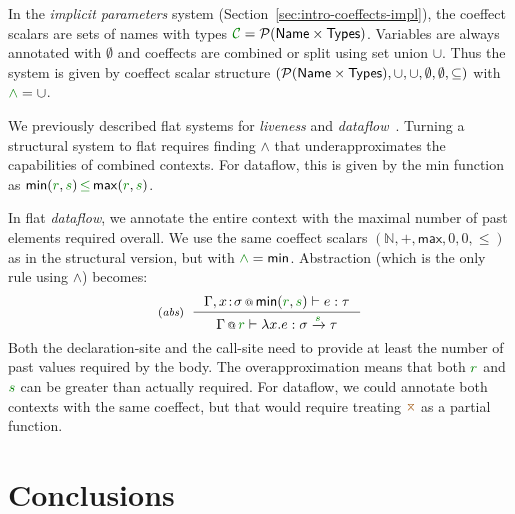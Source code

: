 In the \emph{implicit parameters} system (Section~\ref{sec:intro-coeffects-impl}), 
the co\-effect scalars are sets of names with types 
$\C = \mathcal{P}(\ident{Name} \times \ident{Types}) $. Variables
are always annotated with $\emptyset$ and coeffects are combined or split using set union $\cup$. Thus
the system is given by coeffect scalar structure $(\mathcal{P}(\textnormal{\sffamily Name} \times \textnormal{\sffamily Types}), \cup, \cup, \emptyset, \emptyset, \subseteq)$
with $\cclrd{\wedge} = \cup$.

\begin{remark}
We previously described flat systems for \emph{liveness} and \emph{dataflow}~\cite{petricek2013coeffects}.
Turning a structural system to flat requires finding $\wedge$ that 
underapproximates the capabilities of combined contexts. For dataflow, this is given by the \textsf{min} function as
$\mathsf{min}(\cclrd{r},\cclrd{s}) \,\cleq\, \mathsf{max}(\cclrd{r},\cclrd{s})$.

In flat \emph{dataflow}, we annotate the
entire context with the maximal number of past elements required
overall. We use the same coeffect scalars $(\mathbb{N}, +, \mathsf{max}, 0, 0, \leq)$
as in the structural version, but with
$\cclrd{\wedge} = \ident{min}$. Abstraction (which is the only rule using $\wedge$) becomes:
\[
\tyrule{abs}
  { \coctx{\Gamma, x\!:\!\sigma}{\ident{min}(\cclrd{r}, \cclrd{s})} \vdash e : \tau }
  { \coctx{\Gamma}{\cclrd{r}} \vdash \lambda x . e : \sigma \xrightarrow{\cclrd{s}} \tau }
\]
Both the declaration-site and the call-site need to provide at least
the number of past values required by the body. The overapproximation means that both $\cclrd{r}$
and $\cclrd{s}$ can be greater than actually required.
For dataflow, we could annotate
both contexts with the same coeffect,
but that would require treating $\amerge$ as a partial function.
\end{remark}



\section{Conclusions}
